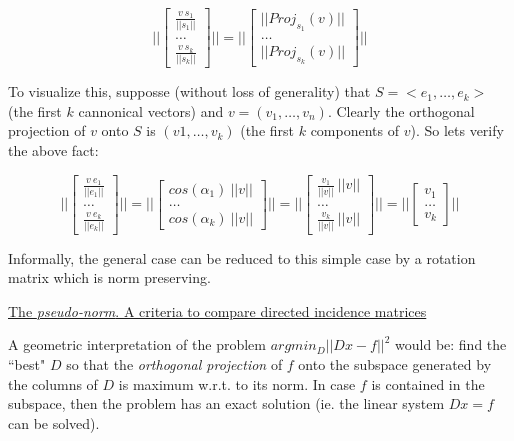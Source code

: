 \documentclass[a4paper,11pt]{article}
\begin{document}
$$
||\begin{bmatrix}
	\frac{v \ s_1}{||s_1||} \\
	\dots \\
	\frac{v \ s_k}{||s_k||}
\end{bmatrix}|| = 
||\begin{bmatrix}
	||Proj_{s_1}(v)|| \\
	\dots \\
	||Proj_{s_k}(v)||
\end{bmatrix}||
$$

\bigskip

To visualize this, supposse (without loss of generality) that $S = 
<e_1, \dots, e_k>$ (the first $k$ cannonical vectors) and $v = (v_1, 
\dots, v_n)$. Clearly the orthogonal projection of $v$ onto $S$ 
is $(v1, \dots, v_k)$ (the first $k$ components of $v$). So lets verify 
the above fact:

$$
||\begin{bmatrix}
	\frac{v \ e_1}{||e_1||} \\
	\dots \\
	\frac{v \ e_k}{||e_k||}
\end{bmatrix}|| = 
||\begin{bmatrix}
	cos(\alpha_1) \ ||v|| \\
	\dots \\
	cos(\alpha_k) \ ||v||
\end{bmatrix}|| = 
||\begin{bmatrix}
	\frac{v_1}{||v||} \ ||v|| \\
	\dots \\
	\frac{v_k}{||v||} \ ||v||
\end{bmatrix}|| = 
||\begin{bmatrix}
	v_1 \\
	\dots \\
	v_k
\end{bmatrix}||
$$

\bigskip

Informally, the general case can be reduced to this simple case by a 
rotation matrix which is norm preserving.

\bigskip

\underline{The \textit{pseudo-norm}. A criteria to compare directed incidence matrices}

\bigskip

A geometric interpretation of the problem $argmin_D||Dx-f||^2$ would be: 
find the ``best" $D$ so that the \textit{orthogonal projection} of $f$ 
onto the subspace generated by the columns of $D$ is 
maximum w.r.t. to its norm. In case $f$ is contained in the subspace, 
then the problem has an exact solution (ie. the linear system $Dx = f$ 
can be solved).
\end{document}
